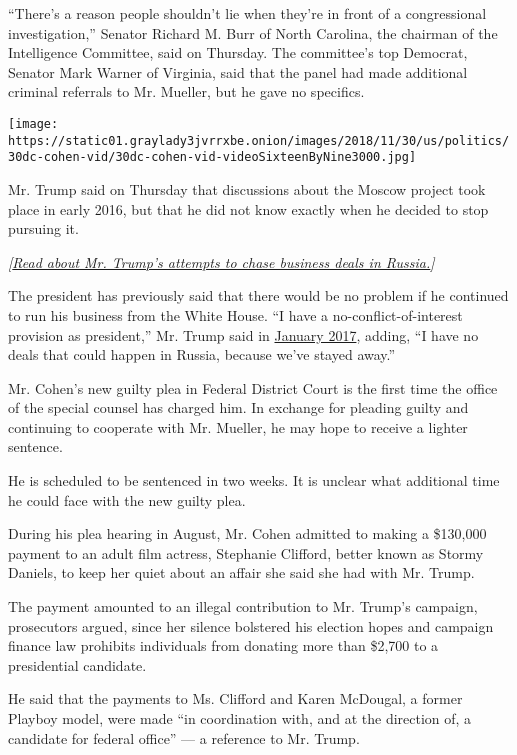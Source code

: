 ``There's a reason people shouldn't lie when they're in front of a
congressional investigation,'' Senator Richard M. Burr of North
Carolina, the chairman of the Intelligence Committee, said on Thursday.
The committee's top Democrat, Senator Mark Warner of Virginia, said that
the panel had made additional criminal referrals to Mr. Mueller, but he
gave no specifics.

\texttt{[image: https://static01.graylady3jvrrxbe.onion/images/2018/11/30/us/politics/30dc-cohen-vid/30dc-cohen-vid-videoSixteenByNine3000.jpg]}

Mr. Trump said on Thursday that discussions about the Moscow project
took place in early 2016, but that he did not know exactly when he
decided to stop pursuing it.

\emph{{[}}\href{https://www.nytimes3xbfgragh.onion/2017/01/16/us/politics/donald-trump-russia-business.html}{\emph{Read
about Mr. Trump's attempts to chase business deals in
Russia.}}\emph{{]}}

The president has previously said that there would be no problem if he
continued to run his business from the White House. ``I have a
no-conflict-of-interest provision as president,'' Mr. Trump said in
\href{https://www.nytimes3xbfgragh.onion/2017/01/11/us/politics/trump-press-conference-transcript.html}{January
2017}, adding, ``I have no deals that could happen in Russia, because
we've stayed away.''

Mr. Cohen's new guilty plea in Federal District Court is the first time
the office of the special counsel has charged him. In exchange for
pleading guilty and continuing to cooperate with Mr. Mueller, he may
hope to receive a lighter sentence.

He is scheduled to be sentenced in two weeks. It is unclear what
additional time he could face with the new guilty plea.

During his plea hearing in August, Mr. Cohen admitted to making a
\$130,000 payment to an adult film actress, Stephanie Clifford, better
known as Stormy Daniels, to keep her quiet about an affair she said she
had with Mr. Trump.

The payment amounted to an illegal contribution to Mr. Trump's campaign,
prosecutors argued, since her silence bolstered his election hopes and
campaign finance law prohibits individuals from donating more than
\$2,700 to a presidential candidate.

He said that the payments to Ms. Clifford and Karen McDougal, a former
Playboy model, were made ``in coordination with, and at the direction
of, a candidate for federal office'' --- a reference to Mr. Trump.

